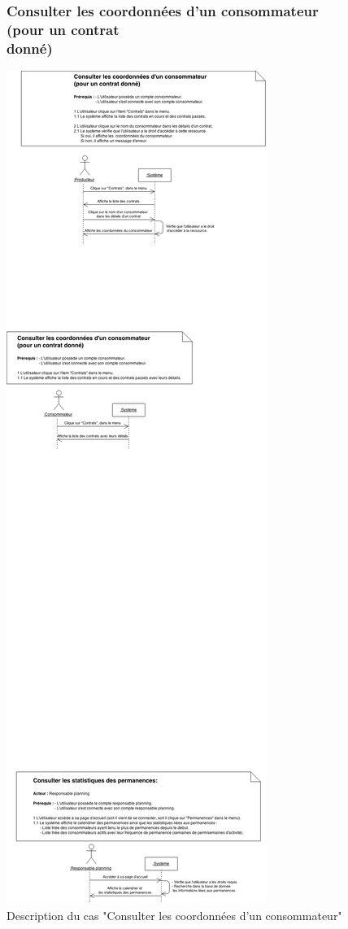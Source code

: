 \documentclass[12pt]{report}
\begin{document}
\begin{figure}[!h]
\centering
\subsubsection{Consulter les coordonnées d'un consommateur (pour un contrat donné)~~~~~~~~~~~~~~~~~~~~~~~~~~~}
\includegraphics[width=1.\textwidth]{./ressources/desc_UC_coo_conso_contrats.png}
\caption{Description du cas "Consulter les coordonnées d'un consommateur"}
\end{figure}
\clearpage
\end{document}
